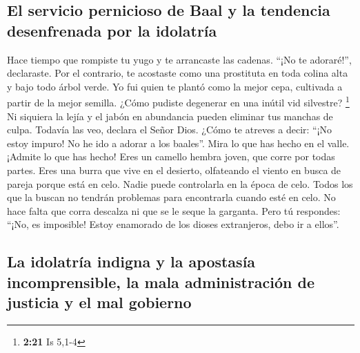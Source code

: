 \hypertarget{el-servicio-pernicioso-de-baal-y-la-tendencia-desenfrenada-por-la-idolatruxeda}{%
\subsection{El servicio pernicioso de Baal y la tendencia desenfrenada
por la
idolatría}\label{el-servicio-pernicioso-de-baal-y-la-tendencia-desenfrenada-por-la-idolatruxeda}}

 Hace tiempo que rompiste tu yugo y te arrancaste las
cadenas. ``¡No te adoraré!'', declaraste. Por el contrario, te acostaste
como una prostituta en toda colina alta y bajo todo árbol verde.
 Yo fui quien te plantó como la mejor cepa, cultivada a
partir de la mejor semilla. ¿Cómo pudiste degenerar en una inútil vid
silvestre? \footnote{\textbf{2:21} Is 5,1-4}  Ni siquiera
la lejía y el jabón en abundancia pueden eliminar tus manchas de culpa.
Todavía las veo, declara el Señor Dios.  ¿Cómo te atreves
a decir: ``¡No estoy impuro! No he ido a adorar a los baales''. Mira lo
que has hecho en el valle. ¡Admite lo que has hecho! Eres un camello
hembra joven, que corre por todas partes.  Eres una burra
que vive en el desierto, olfateando el viento en busca de pareja porque
está en celo. Nadie puede controlarla en la época de celo. Todos los que
la buscan no tendrán problemas para encontrarla cuando esté en celo.
 No hace falta que corra descalza ni que se le seque la
garganta. Pero tú respondes: ``¡No, es imposible! Estoy enamorado de los
dioses extranjeros, debo ir a ellos''.

\hypertarget{la-idolatruxeda-indigna-y-la-apostasuxeda-incomprensible-la-mala-administraciuxf3n-de-justicia-y-el-mal-gobierno}{%
\subsection{La idolatría indigna y la apostasía incomprensible, la mala
administración de justicia y el mal
gobierno}\label{la-idolatruxeda-indigna-y-la-apostasuxeda-incomprensible-la-mala-administraciuxf3n-de-justicia-y-el-mal-gobierno}}


